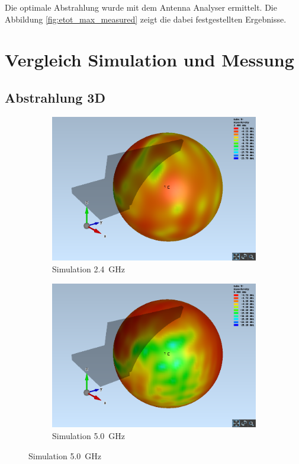 Die optimale Abstrahlung wurde mit dem Antenna Analyser ermittelt.
Die Abbildung \ref{fig:etot_max_measured} zeigt die dabei festgestellten
Ergebnisse.

\clearpage
\section{Vergleich Simulation und Messung}

\subsection{Abstrahlung 3D}

\begin{figure}[h!]
	\centering
	\begin{subfigure}[b]{0.48\textwidth}
		\includegraphics[width=1\textwidth]{../fig/plt/crazy_stuff_l4_pcb_v2c_laptop_1a_105_2ghz4_3d_eabs_sphere.png}
		\caption{Simulation \SI{2.4}{\giga\hertz}}
	\end{subfigure}
	\begin{subfigure}[b]{0.48\textwidth}
		\includegraphics[width=1\textwidth]{../fig/plt/crazy_stuff_l4_pcb_v2c_laptop_1a_105_5ghz_3d_eabs_sphere.png}
		\caption{Simulation \SI{5.0}{\giga\hertz}}
	\end{subfigure}


\end{figure}
